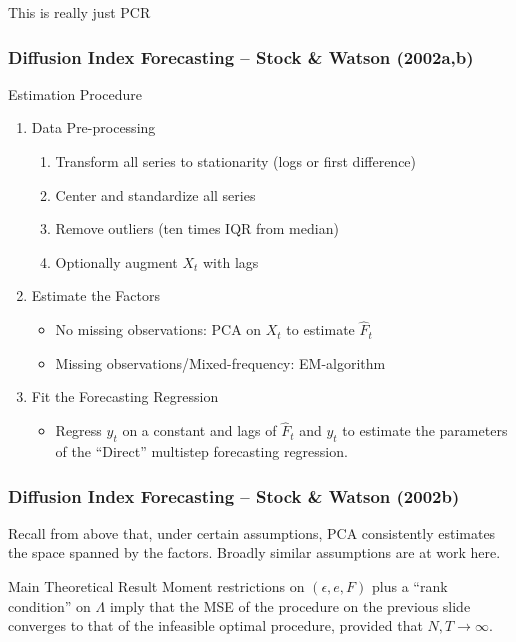 \begin{frame}
\begin{center}
	\Huge This is really just PCR
\end{center}
\end{frame}

\begin{frame}[c]\frametitle{Diffusion Index Forecasting -- Stock \& Watson (2002a,b)}
    
    \begin{block}
    	{Estimation Procedure}
    	\begin{enumerate}
    		\item Data Pre-processing
    			\begin{enumerate}
    			\item Transform all series to stationarity (logs or first difference)
				\item Center and standardize all series
				\item Remove outliers (ten times IQR from median)
				\item Optionally augment $X_t$ with lags
    			\end{enumerate}
    		\item Estimate the Factors
    			\begin{itemize}
    				\item No missing observations: PCA on $X_t$ to estimate $\widehat{F}_t$ 
		\item Missing observations/Mixed-frequency: EM-algorithm
    			\end{itemize}
    		\item Fit the Forecasting Regression
    		\begin{itemize}
    			\item Regress $y_{t}$ on a constant and lags of $\widehat{F}_t$ and $y_t$ to estimate the parameters of the ``Direct'' multistep forecasting regression.
    		\end{itemize}
    	\end{enumerate}
    \end{block}


\end{frame}
\begin{frame}[c]\frametitle{Diffusion Index Forecasting -- Stock \& Watson (2002b)}
    
\alert{Recall from above that, under certain assumptions, PCA consistently estimates the space spanned by the factors. Broadly similar assumptions are at work here.}

\vspace{2em}

\begin{block}
	{Main Theoretical Result}
	Moment restrictions on $(\epsilon, e, F)$ plus a ``rank condition'' on $\Lambda$ imply that the MSE of the procedure on the previous slide converges to that of the infeasible optimal procedure, provided that  $N,T \rightarrow \infty$.
\end{block}

\end{frame}

